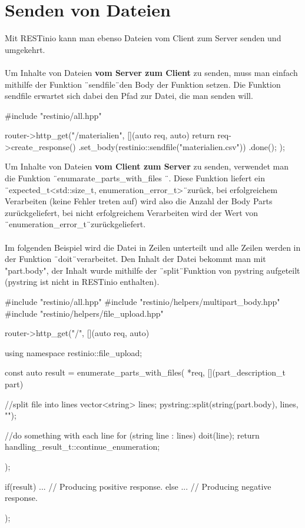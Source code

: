 \documentclass[german,oneside,color]{htldipl}
\begin{document}
\section{Senden von Dateien}
Mit RESTinio kann man ebenso Dateien vom Client zum Server senden und umgekehrt.
\\ \\
Um Inhalte von Dateien \textbf{vom Server zum Client} zu senden, muss man einfach mithilfe der Funktion \"\ sendfile\"\ den Body der Funktion setzen. Die Funktion sendfile erwartet sich dabei den Pfad zur Datei, die man senden will.
\begin{program}[H]
\begin{JavaCode}
#include "restinio/all.hpp"

router->http_get("/materialien", [](auto req, auto) {
    return req->create_response()
        .set_body(restinio::sendfile("materialien.csv"))
        .done();
});

\end{JavaCode}
\end{program}
Um Inhalte von Dateien \textbf{vom Client zum Server} zu senden, verwendet man die Funktion \"\ enumarate\_parts\_with\_files \"\ . Diese Funktion liefert ein \"\ expected\_t<std::size\_t, enumeration\_error\_t>\"\ zurück, bei erfolgreichem Verarbeiten (keine Fehler treten auf) wird also die Anzahl der Body Parts zurückgeliefert, bei nicht erfolgreichem Verarbeiten wird der Wert von \"\ enumeration\_error\_t\"\ zurückgeliefert. 
\\ \\ 
Im folgenden Beispiel wird die Datei in Zeilen unterteilt und alle Zeilen werden in der Funktion \"\ doit\"\ verarbeitet. Den Inhalt der Datei bekommt man mit "part.body", der Inhalt wurde mithilfe der \"\ split\"\ Funktion von pystring aufgeteilt (pystring ist nicht in RESTinio enthalten).
\begin{program}[H]
\begin{JavaCode}
#include "restinio/all.hpp"
#include "restinio/helpers/multipart_body.hpp"
#include "restinio/helpers/file_upload.hpp"

router->http_get("/", [](auto req, auto) {
    using namespace restinio::file_upload;
    
    const auto result = enumerate_parts_with_files( *req,
        [](part_description_t part) {
        //split file into lines
        vector<string> lines;
        pystring::split(string(part.body), lines, "\n");

        //do something with each line
        for (string line : lines) {
            doit(line);
        }
        return handling_result_t::continue_enumeration;
    });
   
    if(result) {
        ... // Producing positive response.
    } else {
        ... // Producing negative response.
    }
});
\end{JavaCode}
\end{program}
\end{document}
